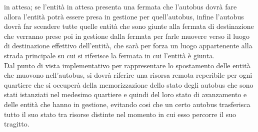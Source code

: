 in attesa; se l'entità in attesa presenta una fermata che l'autobus dovrà fare
allora l'entità potrà essere presa in gestione per quell'autobus, infine
l'autobus dovrà far scendere tutte quelle entità che sono giunte alla fermata
di destinazione che verranno prese poi in gestione dalla fermata per farle
muovere verso il luogo di destinazione effettivo dell'entità, che sarà per
forza un luogo appartenente alla strada principale su cui si riferisce la
fermata in cui l'entità è giunta. \\
Dal punto di vista implementativo per rappresentare lo spostamento delle entità
che muovono nell'autobus, si dovrà riferire una risorsa remota reperibile per
ogni quartiere che si occuperà della memorizzazione dello stato degli autobus
che sono stati istanziati nel medesimo quartiere e quindi del loro stato di
avanzamento e delle entità che hanno in gestione, evitando cosi che un certo
autobus trasferisca tutto il suo stato tra risorse distinte nel momento in cui
esso percorre il suo tragitto.
